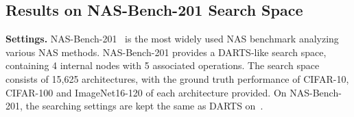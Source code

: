 \documentclass[10pt,twocolumn,letterpaper]{article}
\begin{document}
\subsection{Results on NAS-Bench-201 Search Space} 
\noindent\textbf{Settings.} NAS-Bench-201~\cite{dong2020bench} is the most widely used NAS benchmark analyzing various NAS methods. NAS-Bench-201 provides a DARTS-like search space, containing 4 internal nodes with 5 associated operations. The search space consists of 15,625 architectures, with the ground truth performance of CIFAR-10, CIFAR-100 and ImageNet16-120 of each architecture provided. On NAS-Bench-201, the searching settings are kept the same as DARTS on~\cite{dong2020bench}.

\begin{table*}[t]
\begin{center}


\end{center}
\end{table*}
\end{document}
